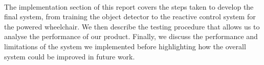 \paragraph{}The implementation section of this report covers the steps taken to develop the final system, from training the object detector to the reactive control system for the powered wheelchair. We then describe the testing procedure that allows us to analyse the performance of our product. Finally, we discuss the performance and limitations of the system we implemented before highlighting how the overall system could be improved in future work.